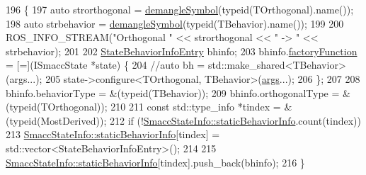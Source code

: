 \begin{DoxyCode}
196   \{
197     \textcolor{keyword}{auto} strorthogonal = \hyperlink{namespacesmacc_1_1introspection_a2f495108db3e57604d8d3ff5ef030302}{demangleSymbol}(\textcolor{keyword}{typeid}(TOrthogonal).name());
198     \textcolor{keyword}{auto} strbehavior = \hyperlink{namespacesmacc_1_1introspection_a2f495108db3e57604d8d3ff5ef030302}{demangleSymbol}(\textcolor{keyword}{typeid}(TBehavior).name());
199 
200     ROS\_INFO\_STREAM(\textcolor{stringliteral}{"Orthogonal "} << strorthogonal << \textcolor{stringliteral}{" -> "} << strbehavior);
201 
202     \hyperlink{structsmacc_1_1introspection_1_1StateBehaviorInfoEntry}{StateBehaviorInfoEntry} bhinfo;
203     bhinfo.\hyperlink{structsmacc_1_1introspection_1_1StateBehaviorInfoEntry_ac7db4e9a687700edb0207ee100aa3576}{factoryFunction} = [=](ISmaccState *state) \{
204       \textcolor{comment}{//auto bh = std::make\_shared<TBehavior>(args...);}
205       state->configure<TOrthogonal, TBehavior>(\hyperlink{namespacegenerate__debs_a75f9143e38df82d83b2e8a6f99cae02c}{args}...);
206     \};
207 
208     bhinfo.behaviorType = &(\textcolor{keyword}{typeid}(TBehavior));
209     bhinfo.orthogonalType = &(\textcolor{keyword}{typeid}(TOrthogonal));
210 
211     \textcolor{keyword}{const} std::type\_info *tindex = &(\textcolor{keyword}{typeid}(MostDerived));
212     \textcolor{keywordflow}{if} (!\hyperlink{classsmacc_1_1introspection_1_1SmaccStateInfo_a2cc62c6c9dec1a4f5294f8430efb71f2}{SmaccStateInfo::staticBehaviorInfo}.count(tindex))
213       \hyperlink{classsmacc_1_1introspection_1_1SmaccStateInfo_a2cc62c6c9dec1a4f5294f8430efb71f2}{SmaccStateInfo::staticBehaviorInfo}[tindex] = 
      std::vector<StateBehaviorInfoEntry>();
214 
215     \hyperlink{classsmacc_1_1introspection_1_1SmaccStateInfo_a2cc62c6c9dec1a4f5294f8430efb71f2}{SmaccStateInfo::staticBehaviorInfo}[tindex].push\_back(bhinfo);
216   \}
\end{DoxyCode}
